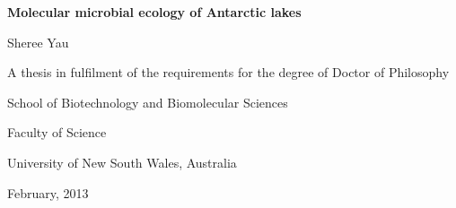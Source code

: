 \begin{titlepage}
\begin{center}
\vspace*{1in}
\LARGE{\textbf{Molecular microbial ecology of Antarctic lakes}}
\par
\vspace{1.5in}
\LARGE{Sheree Yau}
\vfill
\par
\normalsize{A thesis in fulfilment of the requirements for the degree of Doctor of Philosophy}
\par
\vspace{0.5in}
\normalsize{School of Biotechnology and Biomolecular Sciences}
\par
\normalsize{Faculty of Science}
\par
\large{University of New South Wales, Australia}
\par
\vspace{0.5in}
\normalsize{February, 2013}
\par
\vspace{0.5in}
\end{center}
\end{titlepage}
